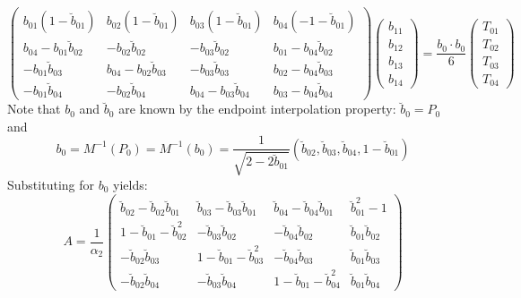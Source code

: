 \documentclass[12pt]{article}
\begin{document}
\begin{equation}
\label{eq:linearsystem}
\left(
\begin{array}{cccc}
b_{01} (1-\breve{b}_{01})     & b_{02} (1-\breve{b}_{01}) & b_{03} (1-\breve{b}_{01}) & b_{04} (-1-\breve{b}_{01}) \\
b_{04} - b_{01}\breve{b}_{02} & -b_{02}\breve{b}_{02}     & -b_{03}\breve{b}_{02}     & b_{01} - b_{04}\breve{b}_{02} \\
-b_{01}\breve{b}_{03}         & b_{04} -b_{02}\breve{b}_{03} & -b_{03}\breve{b}_{03}  & b_{02} - b_{04}\breve{b}_{03} \\
-b_{01}\breve{b}_{04}         & -b_{02}\breve{b}_{04}     & b_{04}-b_{03}\breve{b}_{04} & b_{03} - b_{04}\breve{b}_{04}
\end{array}
\right)
\left(
\begin{array}{c}
b_{11} \\
b_{12} \\
b_{13} \\
b_{14}
\end{array}
\right)
= 
\frac{b_0 \cdot b_0}{6}
\left(
\begin{array}{c}
T_{01} \\
T_{02} \\
T_{03} \\
T_{04}
\end{array}
\right)
\end{equation}
Note that $b_0$ and $\breve{b}_0$ are known by the endpoint interpolation property:
$\breve{b}_0 = P_0$ and
\begin{equation}
b_0 = M^{-1}(P_0) = M^{-1}(b_0) 
     = \frac{1}{\sqrt{2-2\breve{b}_{01}}}(\breve{b}_{02},\breve{b}_{03},\breve{b}_{04},1-\breve{b}_{01})
\end{equation}
Substituting for $b_0$ yields:
\[
A = \frac{1}{\alpha_2}
\left(
\begin{array}{rrrr}
\breve{b}_{02} - \breve{b}_{02}\breve{b}_{01} & \breve{b}_{03} -\breve{b}_{03}\breve{b}_{01} & \breve{b}_{04} - \breve{b}_{04}\breve{b}_{01} & \breve{b}_{01}^2 - 1 \\
1 - \breve{b}_{01} - \breve{b}_{02}^2 & -\breve{b}_{03}\breve{b}_{02}     & -\breve{b}_{04}\breve{b}_{02}     & \breve{b}_{01}\breve{b}_{02} \\
-\breve{b}_{02}\breve{b}_{03} & 1-\breve{b}_{01} - \breve{b}_{03}^2 & -\breve{b}_{04}\breve{b}_{03}  & \breve{b}_{01}\breve{b}_{03} \\
-\breve{b}_{02}\breve{b}_{04}         & -\breve{b}_{03}\breve{b}_{04}     & 1-\breve{b}_{01} - \breve{b}_{04}^2 & \breve{b}_{01}\breve{b}_{04}
\end{array}
\right)
\]
\end{document}
